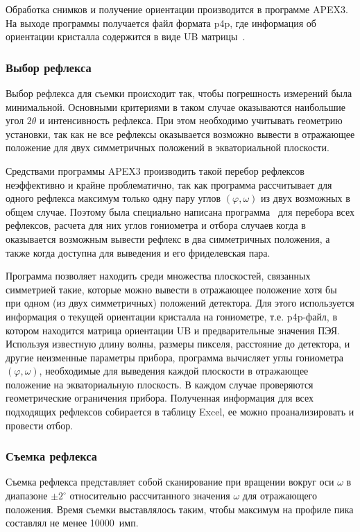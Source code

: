 \documentclass[a4paper,14pt]{extarticle}
\newcommand{\degree}{^\circ}
\newcounter{x}
\begin{document}
Обработка снимков и получение ориентации производится в программе APEX3.
На выходе программы получается файл формата p4p, где информация об ориентации кристалла содержится в виде UB матрицы~\cite{Busing:1967}.
\subsubsection{Выбор рефлекса}
Выбор рефлекса для съемки происходит так, чтобы погрешность измерений была минимальной.
Основными критериями в таком случае оказываются наибольшие угол $2\theta$ и интенсивность рефлекса.
При этом необходимо учитывать геометрию установки, так как не все рефлексы оказывается возможно вывести в отражающее положение для двух симметричных положений в экваториальной плоскости.

Средствами программы APEX3 производить такой перебор рефлексов неэффективно и крайне проблематично, так как программа рассчитывает для одного рефлекса максимум только одну пару углов $(\varphi, \omega)$ из двух возможных в общем случае.
Поэтому была специально написана программа~\cite{Kudryavtsev:2024:eccentr} для перебора всех рефлексов, расчета для них углов гониометра и отбора случаев когда в оказывается возможным вывести рефлекс в два симметричных положения, а также когда доступна для выведения и его фриделевская пара.

Программа позволяет находить среди множества плоскостей, связанных симметрией такие, которые можно вывести в отражающее положение хотя бы при одном (из двух симметричных) положений детектора.
Для этого используется информация о текущей ориентации кристалла на гониометре, т.е. p4p-файл, в котором находится матрица ориентации UB и предварительные значения ПЭЯ.
Используя известную длину волны, размеры пикселя, расстояние до детектора, и другие неизменные параметры прибора, программа вычисляет углы гониометра $(\varphi, \omega)$, необходимые для выведения каждой плоскости в отражающее положение на экваториальную плоскость.
В каждом случае проверяются геометрические ограничения прибора.
Полученная информация для всех подходящих рефлексов собирается в таблицу Excel, ее можно проанализировать и провести отбор.
\subsubsection{Съемка рефлекса}
Съемка рефлекса представляет собой сканирование при вращении вокруг оси $\omega$ в диапазоне $\pm 2\degree$ относительно рассчитанного значения $\omega$ для отражающего положения.
Время съемки выставлялось таким, чтобы максимум на профиле пика составлял не менее 10000~имп.
\end{document}
